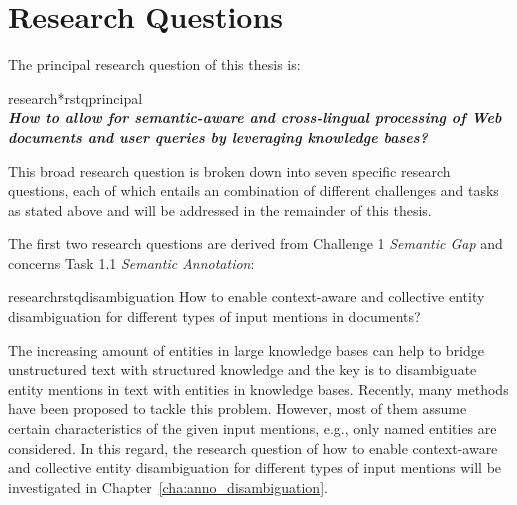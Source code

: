 \section{Research Questions} \label{sec:questions}

The principal research question of this thesis is:
\begin{restatable}{research*}{rstqprincipal} \label{q:qprincipal}
\vspace{1em}~\\
\forceindent \textbf{\emph{How to allow for semantic-aware and cross-lingual processing of Web documents and user queries by leveraging 
knowledge bases?}}
\vspace{1em}
\end{restatable}

This broad research question is broken down into seven specific research questions, each of which entails an combination of different challenges and tasks as stated above and will be addressed in the remainder of this thesis.

\noindent The first two research questions are derived from Challenge 1 \emph{Semantic Gap} and concerns Task 1.1 \emph{Semantic Annotation}:

\begin{restatable}{research}{rstqdisambiguation} \label{q:disambiguation}
How to enable context-aware and collective entity disambiguation for different types of input mentions in documents?
\end{restatable}
\vspace{-0.9em}
The increasing amount of entities in large knowledge bases can help to bridge unstructured text with structured knowledge and the key  is to disambiguate entity mentions in text with entities in knowledge bases. 
Recently, many methods have been proposed to tackle this problem. However, most of them assume certain characteristics of the given input mentions, e.g., only named entities are considered. 
In this regard, the research question of how to enable context-aware and collective entity disambiguation for different types of input mentions will be investigated in Chapter~\ref{cha:anno_disambiguation}.

